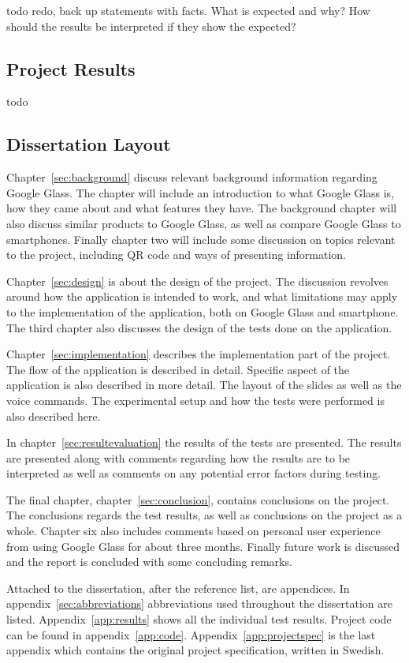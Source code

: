 todo redo, back up statements with facts. What is expected and why? How should the results be interpreted if they show the expected?

\subsection{Project Results}
todo

\subsection{Dissertation Layout}
Chapter~\ref{sec:background} discuss relevant background information regarding Google Glass. The chapter will include an introduction to what Google Glass is, how they came about and what features they have. The background chapter will also discuss similar products to Google Glass, as well as compare Google Glass to smartphones. Finally chapter two will include some discussion on topics relevant to the project, including QR code and ways of presenting information.

Chapter~\ref{sec:design} is about the design of the project. The discussion revolves around how the application is intended to work, and what limitations may apply to the implementation of the application, both on Google Glass and smartphone. The third chapter also discusses the design of the tests done on the application.

Chapter~\ref{sec:implementation} describes the implementation part of the project. The flow of the application is described in detail. Specific aspect of the application is also described in more detail. The layout of the slides as well as the voice commands. The experimental setup and how the tests were performed is also described here.

In chapter~\ref{sec:resultevaluation} the results of the tests are presented. The results are presented along with comments regarding how the results are to be interpreted as well as comments on any potential error factors during testing.

The final chapter, chapter~\ref{sec:conclusion}, contains conclusions on the project. The conclusions regards the test results, as well as conclusions on the project as a whole. Chapter six also includes comments based on personal user experience from using Google Glass for about three months. Finally future work is discussed and the report is concluded with some concluding remarks.

Attached to the dissertation, after the reference list, are appendices. In appendix~\ref{sec:abbreviations} abbreviations used throughout the dissertation are listed. Appendix~\ref{app:results} shows all the individual test results. Project code can be found in appendix~\ref{app:code}. Appendix~\ref{app:projectspec} is the last appendix which contains the original project specification, written in Swedish.